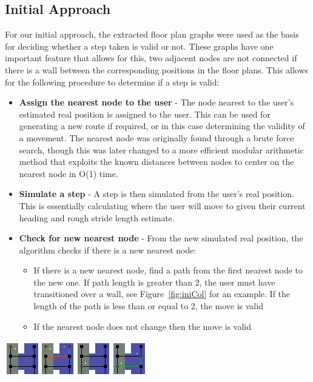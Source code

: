 \documentclass[12pt,a4paper]{report}
\begin{document}
\subsection{Initial Approach}

For our initial approach, the extracted floor plan graphs were used as the basis for deciding whether a step taken is valid or not. These graphs have one important feature that allows for this, two adjacent nodes are not connected if there is a wall between the corresponding positions in the floor plans. This allows for the following procedure to determine if a step is valid:

\begin{itemize}
	\item \textbf{Assign the nearest node to the user} - The node nearest to the user's estimated real position is assigned to the user. This can be used for generating a new route if required, or in this case determining the validity of a movement. The nearest node was originally found through a brute force search, though this was later changed to a more efficient modular arithmetic method that exploits the known distances between nodes to center on the nearest node in O(1) time.
	\item \textbf{Simulate a step} - A step is then simulated from the user's real position. This is essentially calculating where the user will move to given their current heading and rough stride length estimate.
	\item \textbf{Check for new nearest node} - From the new simulated real position, the algorithm checks if there is a new nearest node:
	\begin{itemize}
		\item If there is a new nearest node, find a path from the first nearest node to the new one. If path length is greater than 2, the user must have transitioned over a wall, see Figure~\ref{fig:iniCol} for an example. If the length of the path is less than or equal to 2, the move is valid
		\item If the nearest node does not change then the move is valid
	\end{itemize}
\end{itemize}

\begin{center}
\includegraphics[scale=1.5]{images-implementation/collision1.png}
\label{fig:iniCol}
\end{center}
\end{document}
